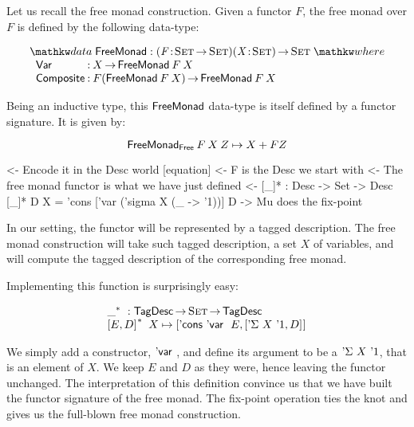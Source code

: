 \newcommand{\FMFreeMonad}{\D{FreeMonad}}
\newcommand{\FMFreeMonadF}{\D{FreeMonad$_{\CN{Free}}$}}
\newcommand{\FMVar}{\C{Var}}
\newcommand{\FMComposite}{\C{Composite}}

Let us recall the free monad construction. Given a functor $F$, the
free monad over $F$ is defined by the following data-type:

\[
\stk{
\data \FMFreeMonad : \PITEL{\V{F}}{\Set \To \Set} 
                     \PI{\V{X}}{\Set} 
                     \Set 
\where \\
\;\;\begin{array}{@{}l@{\::\:}l@{\quad}l}
    \FMVar           & X \To \FMFreeMonad\: F\: X                            \\
    \FMComposite     & F (\FMFreeMonad\: F\: X) \To \FMFreeMonad\: F\: X    
\end{array}
}
\]


Being an inductive type, this $\FMFreeMonad$ data-type is itself
defined by a functor signature. It is given by:

\[
\FMFreeMonadF\: F\: X\: Z \mapsto X + F Z
\]

\begin{wstructure}
    <- Encode it in the Desc world [equation]
        <- F is the Desc we start with
        <- The free monad functor is what we have just defined
        <- [\_]* : Desc -> Set -> Desc
           [\_]* D X = 'cons ['var ('sigma X (\_ -> '1))] D
        -> Mu does the fix-point
\end{wstructure}

In our setting, the functor will be represented by a tagged
description. The free monad construction will take such tagged
description, a set $X$ of variables, and will compute the tagged
description of the corresponding free monad.

Implementing this function is surprisingly easy:

\[\stk{
\FreeMonad{\_} : \TagDesc \To \Set \To \TagDesc \\
\FreeMonad{\pair{E}{D}{}}\:X \mapsto
    \pair{\ListCons{\DVar{}}{E}}
         {\pair{\DSigma{X}{\DUnit}}{D}{}}{}
}\]

We simply add a constructor, $\DVar{}$, and define its argument to be
a $\DSigma{X}{\DUnit}$, that is an element of $X$. We keep $E$ and $D$
as they were, hence leaving the functor unchanged. The interpretation
of this definition convince us that we have built the functor
signature of the free monad. The fix-point operation ties the knot and
gives us the full-blown free monad construction.

